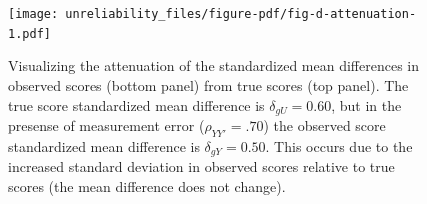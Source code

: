 \documentclass[
  letterpaper,
  DIV=11,
  numbers=noendperiod]{scrreprt}
\begin{document}
\begin{figure}[H]

{\centering \texttt{[image: unreliability\_files/figure-pdf/fig-d-attenuation-1.pdf]}

}

\caption{\label{fig-d-attenuation}Visualizing the attenuation of the
standardized mean differences in observed scores (bottom panel) from
true scores (top panel). The true score standardized mean difference is
\(\delta_{gU}=0.60\), but in the presense of measurement error
(\(\rho_{YY'}=.70\)) the observed score standardized mean difference is
\(\delta_{gY}=0.50\). This occurs due to the increased standard
deviation in observed scores relative to true scores (the mean
difference does not change).}

\end{figure}
\end{document}
